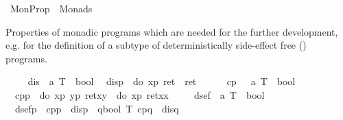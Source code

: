 %
\begin{isabellebody}%
\def\isabellecontext{MonProp}%
%
\isamarkuptrue%
\ MonProp\ {\isacharequal}\ Monads{\isacharcolon}\isamarkupfalse%
%
\label{sec:monprop-thy}
%
\isamarkuptrue%
%
\begin{isamarkuptext}%
Properties of monadic programs which are needed for the further development,
  e.g. for the definition of a subtype  of deterministically
  side-effect free () programs.
  \label{isa:mon-properties}%
\end{isamarkuptext}%
\isamarkuptrue%
\isanewline
\ \ %
\isanewline
\ \ dis\ {\isacharcolon}{\isacharcolon}\ {\isachardoublequote}{\isacharprime}a\ T\ {\isasymRightarrow}\ bool{\isachardoublequote}\isanewline
\ \ {\isachardoublequote}dis{\isacharparenleft}p{\isacharparenright}\ {\isasymequiv}\ {\isacharparenleft}do\ {\isacharbraceleft}x{\isasymleftarrow}p{\isacharsemicolon}\ ret{\isacharparenleft}{\isacharparenright}{\isacharbraceright}{\isacharparenright}\ {\isacharequal}\ ret\ {\isacharparenleft}{\isacharparenright}{\isachardoublequote}\isanewline
\ \ %
\isanewline
\ \ cp\ \ {\isacharcolon}{\isacharcolon}\ {\isachardoublequote}{\isacharprime}a\ T\ {\isasymRightarrow}\ bool{\isachardoublequote}\isanewline
\ \ {\isachardoublequote}cp{\isacharparenleft}p{\isacharparenright}\ {\isasymequiv}\ {\isacharparenleft}do\ {\isacharbraceleft}x{\isasymleftarrow}p{\isacharsemicolon}\ y{\isasymleftarrow}p{\isacharsemicolon}\ ret{\isacharparenleft}x{\isacharcomma}y{\isacharparenright}{\isacharbraceright}{\isacharparenright}\ {\isacharequal}\ {\isacharparenleft}do\ {\isacharbraceleft}x{\isasymleftarrow}p{\isacharsemicolon}\ ret{\isacharparenleft}x{\isacharcomma}x{\isacharparenright}{\isacharbraceright}{\isacharparenright}{\isachardoublequote}\isanewline
\ \ %
\isanewline
\ \ dsef\ {\isacharcolon}{\isacharcolon}\ {\isachardoublequote}{\isacharprime}a\ T\ {\isasymRightarrow}\ bool{\isachardoublequote}\isanewline
\ \ {\isachardoublequote}dsef{\isacharparenleft}p{\isacharparenright}\ {\isasymequiv}\ cp{\isacharparenleft}p{\isacharparenright}\ {\isasymand}\ dis{\isacharparenleft}p{\isacharparenright}\ {\isasymand}\ {\isacharparenleft}{\isasymforall}q{\isacharcolon}{\isacharcolon}bool\ T{\isachardot}\ cp{\isacharparenleft}q{\isacharparenright}\ {\isasymand}\ dis{\isacharparenleft}q{\isacharparenright}\ {\isasymlongrightarrow}\ \isanewline

\end{isabellebody}

